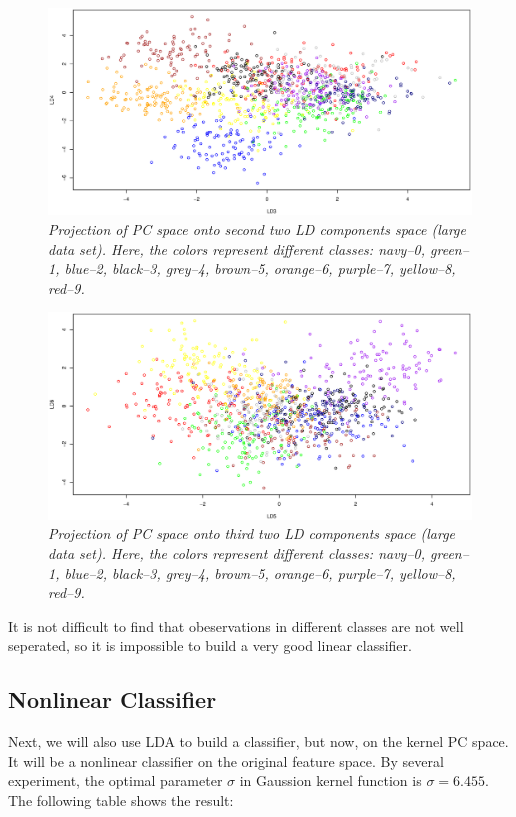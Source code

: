 \documentclass{article}
\begin{document}
\begin{figure}[htp]
\centering
\includegraphics[width=12.1cm]{large_pcalda_LD34_train.eps}
\caption{\textit{Projection of PC space onto second two LD components space (large data set). Here, the colors represent different classes: navy--0, green--1, 
blue--2, black--3, grey--4, brown--5, orange--6, purple--7, yellow--8, red--9.}}
\end{figure}

\begin{figure}[htp]
\centering
\includegraphics[width=12.1cm]{large_pcalda_LD56_train.eps}
\caption{\textit{Projection of PC space onto third two LD components space (large data set). Here, the colors represent different classes: navy--0, green--1, 
blue--2, black--3, grey--4, brown--5, orange--6, purple--7, yellow--8, red--9.}}
\end{figure}

It is not difficult to find that obeservations in different classes are not well seperated, so it is impossible to build a very good linear classifier.

\newpage

\subsection{Nonlinear Classifier}

Next, we will also use LDA to build a classifier, but now, on the kernel PC space. It will be a nonlinear classifier on the original feature space. 
By several experiment, the optimal parameter $\sigma$ in Gaussion kernel function is $\sigma=6.455$. The following table shows the result:
\end{document}
